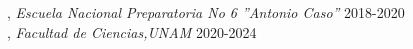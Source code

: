 , \textit{Escuela Nacional Preparatoria No 6 ''Antonio Caso''}	\hfill 2018-2020\\
, \textit{Facultad de Ciencias,UNAM}	\hfill 2020-2024





